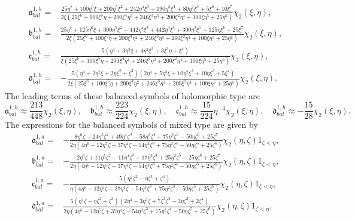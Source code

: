 \documentclass[10pt]{amsart}
\theoremstyle{remark}
\theoremstyle{definition}
\numberwithin{equation}{section}
\newcommand{\f}{\frac}
\begin{document}
\begin{align*}
\mathfrak{a}^{1,h}_{bal}=&\f{25\eta^7+100\eta^6\xi+200\eta^5\xi^2+242\eta^4\xi^3+190\eta^3\xi^4+80\eta^2\xi^5+5\xi^6+10\xi^7}{2\xi(25\xi^6+100\xi^5\eta+200\xi^4\eta^2+246\xi^3\eta^3+200\xi^2\eta^4+100\xi\eta^5+25\eta^6)}\chi_{2}(\xi,\eta),\\
\mathfrak{b}^{1,h}_{bal}=&\f{25\eta^7+125\eta^6\xi+300\eta^5\xi^2+442\eta^4\xi^3+442\eta^3\xi^4+300\eta^2\xi^5+125\eta\xi^6+25\xi^7}
{2\xi(25\xi^6+100\xi^5\eta+200\xi^4\eta^2+246\xi^3\eta^3+200\xi^2\eta^4+100\xi\eta^5+25\eta^6)}\chi_{2}(\xi,\eta),\\
\mathfrak{c}^{1,h}_{bal}=&\f{5(\eta^4+3\eta^3\xi+4\eta^2\xi^2+3\xi^3\eta+\xi^4)}
{\xi(25\xi^6+100\xi^5\eta+200\xi^4\eta^2+246\xi^3\eta^3+200\xi^2\eta^4+100\xi\eta^5+25\eta^6)}\chi_{2}(\xi,\eta),\\
\mathfrak{d}^{1,h}_{bal}=&-\f{5(\eta^3+2\eta^2\xi+2\eta\xi^2+\xi^3)(2\eta^4+5\eta^3\xi+10\eta^2\xi^2+10\eta\xi^3+5\xi^4)}
{2\xi(25\xi^6+100\xi^5\eta+200\xi^4\eta^2+246\xi^3\eta^3+200\xi^2\eta^4+100\xi\eta^5+25\eta^6)}\chi_{2}(\xi,\eta).
\end{align*}
The leading terms of these balanced symbols of holomorphic type are
\begin{equation*}
\mathfrak{a}^{1,h}_{bal} \approx\f{213}{448}\chi_{2}(\xi, \eta), \quad \mathfrak{b}^{1,h}_{bal} \approx \f{223}{224}\chi_{2}(\xi, \eta),  \quad \mathfrak{c}^{1,h}_{bal} \approx \f{15}{224}\eta^{-3}\chi_{2}(\xi, \eta), \quad \mathfrak{d}^{1,h}_{bal} \approx -\f{15}{28}\chi_{2}(\xi, \eta).   
\end{equation*}
The expressions for the balanced symbols of mixed type are given by
\begin{align*}
\mathfrak{a}^{1,a}_{bal}=&-\f{8\eta^6\zeta-24\eta^5\zeta^2+49\eta^4\zeta^3-58\eta^3\zeta^4+75\eta^2\zeta^5-50\eta\zeta^6+25\zeta^7}{2\eta(4\eta^6-12\eta^5\zeta+37\eta^4\zeta-54\eta^3\zeta^3+75\eta^2\zeta^4-50\eta\zeta^5+25\zeta^6)}\chi_{2}(\eta, \zeta)1_{\zeta<\eta},\\
\mathfrak{b}^{1,a}_{bal}=&-\f{-2\eta^6\zeta+11\eta^5\zeta^2-11\eta^4\zeta^3+17\eta^3\zeta^4+25\eta^2\zeta^5-25\eta\zeta^6+25\zeta^7}{2\eta(4\eta^6-12\eta^5\zeta+37\eta^4\zeta-54\eta^3\zeta^3+75\eta^2\zeta^4-50\eta\zeta^5+25\zeta^6)}\chi_{2}(\eta, \zeta)1_{\zeta<\eta},\\
\mathfrak{c}^{1,a}_{bal}=&-\f{5(\eta^2\zeta^2-\eta\zeta^3+\zeta^4)}{\eta(4\eta^6-12\eta^5\zeta+37\eta^4\zeta-54\eta^3\zeta^3+75\eta^2\zeta^4-50\eta\zeta^5+25\zeta^6)}\chi_{2}(\eta, \zeta)1_{\zeta<\eta},\\
\mathfrak{d}^{1,a}_{bal}=&\f{5(\eta^2\zeta-\eta\zeta^2+\zeta^3)(2\eta^4-3\eta^3\zeta+7\zeta^2\zeta^2-3\eta\zeta^3+2\zeta^4)}{2\eta(4\eta^6-12\eta^5\zeta+37\eta^4\zeta-54\eta^3\zeta^3+75\eta^2\zeta^4-50\eta\zeta^5+25\zeta^6)}\chi_{2}(\eta, \zeta)1_{\zeta<\eta}.   
\end{align*}
\end{document}
